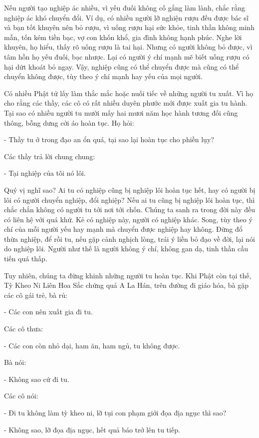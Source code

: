 \documentclass[
  12pt,
  oneside]{book}
\begin{document}
Nếu người tạo nghiệp ác nhiều, vì yếu đuối không cố gắng làm lành, chắc rằng nghiệp ác khó chuyển đổi. Ví dụ, có nhiều người lỡ nghiện rượu đều được bác sĩ và bạn tốt khuyên nên bỏ rượu, vì uống rượu hại sức khỏe, tinh thần không minh mẫn, tốn kém tiền bạc, vợ con khốn khổ, gia đình không hạnh phúc. Nghe lời khuyên, họ hiểu, thấy rõ uống rượu là tai hại. Nhưng có người không bỏ được, vì tâm hồn họ yếu đuối, bạc nhược. Lại có người ý chí mạnh mẽ biết uống rượu có hại dứt khoát bỏ ngay. Vậy, nghiệp cũng có thể chuyển được mà cũng có thể chuyển không được, tùy theo ý chí mạnh hay yếu của mọi người.

Có nhiều Phật tử lấy làm thắc mắc hoặc nuối tiếc về những người tu xuất. Vì họ cho rằng các thầy, các cô có rất nhiều duyên phước mới được xuất gia tu hành. Tại sao có nhiều người tu mười mấy hai mươi năm học hành tương đối cũng thông, bỗng dưng cởi áo hoàn tục. Họ hỏi:

- Thầy tu ở trong đạo an ổn quá, tại sao lại hoàn tục cho phiền lụy?

Các thầy trả lời chung chung:

- Tại nghiệp của tôi nó lôi.

Quý vị nghĩ sao? Ai tu có nghiệp cũng bị nghiệp lôi hoàn tục hết, hay có người bị lôi có người chuyển nghiệp, đổi nghiệp? Nếu ai tu cũng bị nghiệp lôi hoàn tục, thì chắc chắn không có người tu tới nơi tới chốn. Chúng ta sanh ra trong đời này đều có liên hệ với quá khứ. Kẻ có nghiệp này, người có nghiệp khác. Song, tùy theo ý chí của mỗi người yếu hay mạnh mà chuyển được nghiệp hay không. Đừng đổ thừa nghiệp, để rồi tu, nếu gặp cảnh nghịch lòng, trái ý liền bỏ đạo về đời, lại nói do nghiệp lôi. Người như thế là người không ý chí, không gan dạ, tinh thần cầu tiến quá thấp.

Tuy nhiên, chúng ta đừng khinh những người tu hoàn tục. Khi Phật còn tại thế, Tỳ Kheo Ni Liên Hoa Sắc chứng quả A La Hán, trên đường đi giáo hóa, bà gặp các cô gái trẻ, bà rủ:

- Các con nên xuất gia đi tu.

Các cô thưa:

- Các con còn nhỏ dại, ham ăn, ham ngủ, tu không được.

Bà nói:

- Không sao cứ đi tu.

Các cô nói:

- Đi tu không làm tỳ kheo ni, lỡ tụi con phạm giới đọa địa ngục thì sao?

- Không sao, lỡ đọa địa ngục, hết quả báo trở lên tu tiếp.
\end{document}
